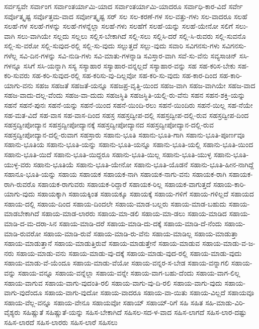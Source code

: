 {ಸರ್ವಸ್ವವೇ
ಸರ್ವಾಂಗ
ಸರ್ವಾಂತರ್ಯಾಮಿ-ಯಾದ
ಸರ್ವಾಂತರ್ಯಾಮಿ-ಯಾದರೂ
ಸರ್ವಾಧಿ-ಕಾರ-ವಿದೆ
ಸರ್ವೇ
ಸರ್ವೊತ್ಕೃಷ್ಟ
ಸರ್ವೊತ್ತಮ-ವಾದ
ಸರ್ವೋತ್ಕೃಷ್ಟ
ಸರ್‌
ಸಲ
ಸಲ-ಕರಣೆ-ಗಳ
ಸಲ-ವತ್ತು-ಗಳು
ಸಲ-ವಾದರೂ
ಸಲಹೆ
ಸಲಹೆ-ಗಳ
ಸಲಹೆ-ಗಳನ್ನು
ಸಲಹೆ-ಗಳನ್ನೆಲ್ಲಾ
ಸಲಹೆ-ಗಳು
ಸಲಹೆಗೆ
ಸಲಹೆ-ಯನ್ನು
ಸಲಹೆ-ಯೇನೋ
ಸಲಿಗೆ
ಸಲು-ವಾಗಿ
ಸಲು-ವಾಗಿಯೇ
ಸಲ್ಲದು
ಸಲ್ಲಲು
ಸಲ್ಲಿಸ-ಬೇಕಾಗಿದೆ
ಸಲ್ಲಿ-ಸಲು
ಸಲ್ಲಿಸಿ-ದರೆ
ಸಲ್ಲಿ-ಸಿ-ರುವರು
ಸಲ್ಲಿ-ಸುವನೊ
ಸಲ್ಲಿ-ಸು-ವರೋ
ಸಲ್ಲಿ-ಸುವುದ-ರಲ್ಲಿ
ಸಲ್ಲಿ-ಸು-ವುದು
ಸಲ್ಲುತ್ತದೆ
ಸಲ್ಲು-ವುದು
ಸವಾರಿ
ಸವಿಗನಸು-ಗಳು
ಸವಿಗನಸು-ಗಳೆಲ್ಲ
ಸವಿ-ದಿನ-ಗಳನ್ನು
ಸವಿ-ನುಡಿ-ಗಳು
ಸವಿ-ಮಾತು-ಗಳನ್ನಾಡಿ
ಸವಿಸ್ತಾರ-ವಾಗಿ
ಸವೆ-ಸು-ವೆನು
ಸವ್ಯಸಾಚಿನ್
ಸಸಿ-ಗಳನ್ನೂ
ಸಸಿಗೆ
ಸಸಿ-ಯನ್ನಾಗಿ
ಸಸ್ಯ
ಸಸ್ಯಾಹಾರ
ಸಸ್ಯಾಹಾರ-ವನ್ನಲ್ಲದೆ
ಸಸ್ಯಾಹಾರ-ವನ್ನು
ಸಹ
ಸಹ-ಕರಿಸ-ಬೇಕು
ಸಹ-ಕರಿ-ಸುವರು
ಸಹ-ಕರಿ-ಸುವುದ-ರಲ್ಲಿ
ಸಹ-ಕರಿಸು-ವು-ದಿಲ್ಲವೋ
ಸಹ-ಕರಿ-ಸು-ವುದು
ಸಹ-ಕಾರ-ದಿಂದ
ಸಹ-ಕಾರಿ-ಯಾಗು-ವನು
ಸಹಜ
ಸಹಜತೆ
ಸಹಜತೆ-ಯನ್ನೂ
ಸಹಜಪ್ರ-ವೃತ್ತಿ-ಯಿಂದ
ಸಹಜ-ವಾಗಿ
ಸಹಜ-ವಾಗಿಯೇ
ಸಹಜ-ವಾದ
ಸಹಜ-ವಾದು-ದಲ್ಲ-ವೆಂದು
ಸಹಜ-ವಾ-ದುದು
ಸಹಜಸ್ಥಿತಿ
ಸಹಜಸ್ಥಿತಿ-ಯಲ್ಲಿ-ರು-ವೆನು
ಸಹನ
ಸಹನ-ಶಕ್ತಿ-ಯನ್ನು
ಸಹನೆ
ಸಹನೆ-ಪುನಃ
ಸಹನೆ-ಯನ್ನು
ಸಹನೆ-ಯಿಂದ
ಸಹನೆ-ಯಿಂದಿ-ರಲು
ಸಹನೆ-ಯಿಂದಿರು
ಸಹನೆ-ಯಿಲ್ಲ
ಸಹ-ನೆಯೇ
ಸಹ-ಮತ-ವಿದೆ
ಸಹ-ವಾಸ
ಸಹ-ವಾಸ-ದಿಂದ
ಸಹಸ್ರ
ಸಹಸ್ರದ್ವೀಪ-ದಲ್ಲಿ
ಸಹಸ್ರದ್ವೀಪ-ದಲ್ಲಿ-ರುವ
ಸಹಸ್ರದ್ವೀಪ-ದಿಂದ
ಸಹಸ್ರದ್ವೀಪೋದ್ಯಾನ
ಸಹಸ್ರದ್ವೀಪೋದ್ಯಾನಕ್ಕೆ
ಸಹಸ್ರದ್ವೀಪೋದ್ಯಾನದ
ಸಹಸ್ರದ್ವೀಪೋದ್ಯಾನ-ದಲ್ಲಿ-ರುವ
ಸಹಸ್ರದ್ವೀಪೋದ್ಯಾನ-ದಲ್ಲಿ-ರುವಾಗ
ಸಹಸ್ರಾರು
ಸಹಾನು-ಭೂತಿ
ಸಹಾನು-ಭೂತಿ-ಗಾಗಿ
ಸಹಾನು-ಭೂತಿ-ಪೂರ್ಣವೂ
ಸಹಾನು-ಭೂತಿಯ
ಸಹಾನು-ಭೂತಿ-ಯನ್ನು
ಸಹಾನು-ಭೂತಿ-ಯನ್ನೂ
ಸಹಾನು-ಭೂತಿ-ಯಲ್ಲಿ
ಸಹಾನು-ಭೂತಿ-ಯಿಂದ
ಸಹಾನು-ಭೂತಿ-ಯಿದೆ
ಸಹಾನು-ಭೂತಿ-ಯಿದ್ದರೂ
ಸಹಾನು-ಭೂತಿ-ಯಿಲ್ಲ
ಸಹಾನು-ಭೂತಿ-ಯುಳ್ಳ
ಸಹಾನು-ಭೂತಿ-ಯುಳ್ಳ-ವರು
ಸಹಾನು-ಭೂತಿಯೆ
ಸಹಾನು-ಭೂತಿ-ಯೇನೋ
ಸಹಾನು-ಭೂತಿ-ಯೊಡನೆ
ಸಹಾನು-ಭೂತಿ-ಹೀನ-ನಾಗಿದ್ದೆ
ಸಹಾನೂ-ಭೂತಿ-ಯನ್ನು
ಸಹಾಯ
ಸಹಾಯಕ
ಸಹಾಯಕ-ನಾಗಿ
ಸಹಾಯಕ-ನಾಗು-ವನು
ಸಹಾಯಕ-ರಾಗಿ
ಸಹಾಯಕ-ರಾಗಿ-ರುವರೊ
ಸಹಾಯಕ-ರಾಗುವರು
ಸಹಾಯಕ-ರಿದ್ದಾರೆ
ಸಹಾಯಕ-ರಿಲ್ಲ
ಸಹಾಯಕ-ವಾಗುತ್ತದೆ
ಸಹಾಯ-ಕಾರಿ-ಯಾಗು-ವುದು
ಸಹಾಯಕ್ಕಾಗಿ
ಸಹಾಯಕ್ಕಿಂತ
ಸಹಾಯಕ್ಕೂ
ಸಹಾಯಕ್ಕೆ
ಸಹಾಯ-ಗಳಿಗೆ
ಸಹಾಯ-ಗಳಿಲ್ಲದೆ
ಸಹಾಯದ
ಸಹಾಯ-ದಲ್ಲಿ
ಸಹಾಯ-ದಿಂದ
ಸಹಾಯ-ದಿಂದಲೇ
ಸಹಾಯ-ಮಾಡ-ಬಲ್ಲರು
ಸಹಾಯ-ಮಾಡ-ಬಹುದು
ಸಹಾಯ-ಮಾಡಬೇಕಾಗಿದೆ
ಸಹಾಯ-ಮಾಡ-ಲಾರರು
ಸಹಾಯ-ಮಾ-ಡಲಿ
ಸಹಾಯ-ಮಾ-ಡಲು
ಸಹಾಯ-ಮಾಡಿದ
ಸಹಾಯ-ಮಾಡಿ-ದ-ಮ-ದರಾ-ಸಿನ
ಸಹಾಯ-ಮಾಡಿ-ದರೆ
ಸಹಾಯ-ಮಾಡಿ-ದು-ದಕ್ಕೆ
ಸಹಾಯ-ಮಾಡಿ-ದೆ-ನೆಂದು
ಸಹಾಯ-ಮಾಡಿ-ರುವರೋ
ಸಹಾಯ-ಮಾಡಿ-ರುವೆ
ಸಹಾಯ-ಮಾಡಿ-ರು-ವೆನು
ಸಹಾಯ-ಮಾಡಿಲ್ಲ
ಸಹಾಯ-ಮಾಡುತ್ತಾ
ಸಹಾಯ-ಮಾಡುತ್ತಾನೆ
ಸಹಾಯ-ಮಾಡುತ್ತಿರುವೆ
ಸಹಾಯ-ಮಾಡುತ್ತೇನೆ
ಸಹಾಯ-ಮಾಡುವ
ಸಹಾಯ-ಮಾಡು-ವ-ಜ-ನರು
ಸಹಾಯ-ಮಾಡು-ವನು
ಸಹಾಯ-ಮಾಡು-ವು-ದಕ್ಕೆ
ಸಹಾಯ-ಮಾಡು-ವುದ-ರಲ್ಲಿ
ಸಹಾಯ-ಮಾಡು-ವುದು
ಸಹಾಯ-ಮಾಡು-ವೆ-ಯೆಂದೂ
ಸಹಾಯ-ಮಾಡು-ವೆಯೋ
ಸಹಾಯ-ವನ್ನರ-ಸ-ಬೇಡ
ಸಹಾಯ-ವನ್ನಾಗಲಿ
ಸಹಾಯ-ವನ್ನು
ಸಹಾಯ-ವನ್ನೂ
ಸಹಾಯ-ವನ್ನೆಲ್ಲಾ
ಸಹಾಯ-ವನ್ನೇ
ಸಹಾಯ-ವಾಗ-ಬಹು-ದೆಂದು
ಸಹಾಯ-ವಾಗ-ಲಿಲ್ಲ
ಸಹಾಯ-ವಾಗುವ
ಸಹಾಯ-ವಾಗು-ವುದಂತಿ-ರಲಿ
ಸಹಾಯ-ವಾಗು-ವು-ದಿ-ರಲಿ
ಸಹಾಯ-ವಾಗು-ವುದು
ಸಹಾಯ-ವಾಗು-ವುದೆಂದೂ
ಸಹಾಯ-ವಾಗು-ವುದೋ
ಸಹಾಯ-ವಾದರೂ
ಸಹಾಯ-ವಾ-ಯಿತು
ಸಹಾಯ-ವಿಲ್ಲದೆ
ಸಹಾಯವೂ
ಸಹಾಯ-ವೆಲ್ಲ-ವನ್ನೂ
ಸಹಾಯ-ವೇನೂ
ಸಹಾಯವೋ
ಸಹಾಯ್
ಸಹಾಯ್‌-ರಿಗೆ
ಸಹಿ
ಸಹಿತ
ಸಹಿ-ಮಾಡು-ವಿರಿ-ವೈಶ್ಯರು
ಸಹಿಷ್ಣುತೆ
ಸಹಿಷ್ಣುತೆ-ಯನ್ನು
ಸಹಿಸ-ಬೇಕಾಗಿದೆ
ಸಹಿಸಲ-ಸದ-ಳ-ವಾದ
ಸಹಿಸ-ಲಾಗದೆ
ಸಹಿಸ-ಲಾರ-ದಷ್ಟು
ಸಹಿಸ-ಲಾರದೆ
ಸಹಿಸ-ಲಾರರು
ಸಹಿಸ-ಲಾರೆ
ಸಹಿಸಲು
}
